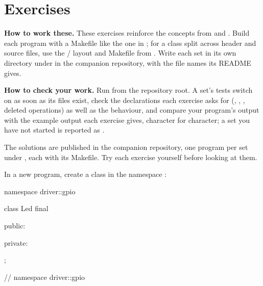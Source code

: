 
\section{Exercises}
\label{c2:sec:exercises}\label{c2:app:c}

\begin{aside}
\textbf{How to work these.} These exercises reinforce the concepts from  and
. Build each program with a Makefile like the one in
; for a class split across header and source files, use the
/ layout and Makefile from . Write each set in its
own directory under  in the companion repository, with the file names
its README gives.

\textbf{How to check your work.} Run  from the repository root. A set's tests
switch on as soon as its files exist, check the declarations each exercise asks for
(, , , deleted operations) as well as the behaviour, and
compare your program's output with the example output each exercise gives, character for
character; a set you have not started is reported as .

The solutions are published in the companion repository, one program per set under
, each with its Makefile. Try each exercise yourself before
looking at them.
\end{aside}

\label{c2:set:1}

\label{c2:ex:1.1}
In a new program, create a class  in the namespace :

\begin{cppcode}
namespace driver::gpio
{
class Led final
{
public:

private:
};
} // namespace driver::gpio
\end{cppcode}

